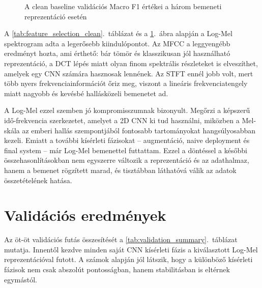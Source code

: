 \begin{figure}[H]
\centering
{}
\caption{A clean baseline validációs Macro F1 értékei a három bemeneti reprezentáció esetén}
\label{fig:feature_selection_clean}
\end{figure}

A \ref{tab:feature_selection_clean}.~táblázat és a \ref{fig:feature_selection_clean}.~ábra alapján a Log-Mel spektrogram adta a legerősebb kiindulópontot. Az MFCC a leggyengébb eredményt hozta, ami érthető: bár tömör és klasszikusan jól használható reprezentáció, a DCT lépés miatt olyan finom spektrális részleteket is elveszíthet, amelyek egy CNN számára hasznosak lennének. Az STFT ennél jobb volt, mert több nyers frekvenciainformációt őriz meg, viszont a lineáris frekvenciatengely miatt nagyobb és kevésbé hallásközeli bemenetet ad.

A Log-Mel ezzel szemben jó kompromisszumnak bizonyult. Megőrzi a képszerű idő-frekvencia szerkezetet, amelyet a 2D CNN ki tud használni, miközben a Mel-skála az emberi hallás szempontjából fontosabb tartományokat hangsúlyosabban kezeli. Emiatt a további kísérleti fázisokat -- augmentáció, naive deployment és final system -- már Log-Mel bemenettel futtattam. Ezzel a döntéssel a későbbi összehasonlításokban nem egyszerre változik a reprezentáció és az adathalmaz, hanem a bemenet rögzített marad, és tisztábban láthatóvá válik az adatok összetételének hatása.

\section{Validációs eredmények}
\label{sec:validacios_eredmenyek}

Az öt-öt validációs futás összesítését a \ref{tab:validation_summary}.~táblázat mutatja. Innentől kezdve minden saját CNN kísérleti fázis a kiválasztott Log-Mel reprezentációval futott. A számok alapján jól látszik, hogy a különböző kísérleti fázisok nem csak abszolút pontosságban, hanem stabilitásban is eltérnek egymástól.

